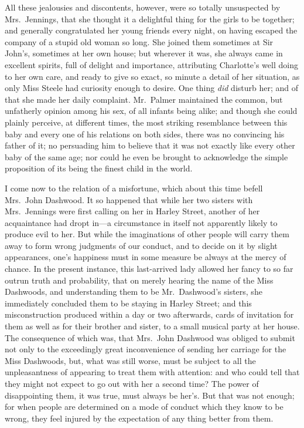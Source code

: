 All these jealousies and discontents, however, were so
totally unsuspected by Mrs.\ Jennings, that she thought
it a delightful thing for the girls to be together;
and generally congratulated her young friends every night,
on having escaped the company of a stupid old woman so long.
She joined them sometimes at Sir John's, sometimes
at her own house; but wherever it was, she always came
in excellent spirits, full of delight and importance,
attributing Charlotte's well doing to her own care, and ready
to give so exact, so minute a detail of her situation,
as only Miss Steele had curiosity enough to desire.
One thing \emph{did} disturb her; and of that she made her
daily complaint.  Mr.\ Palmer maintained the common,
but unfatherly opinion among his sex, of all infants being alike;
and though she could plainly perceive, at different times,
the most striking resemblance between this baby and every
one of his relations on both sides, there was no convincing
his father of it; no persuading him to believe that it
was not exactly like every other baby of the same age;
nor could he even be brought to acknowledge the simple
proposition of its being the finest child in the world.

I come now to the relation of a misfortune,
which about this time befell Mrs.\ John Dashwood.
It so happened that while her two sisters with
Mrs.\ Jennings were first calling on her in Harley Street,
another of her acquaintance had dropt in---a circumstance
in itself not apparently likely to produce evil to her.
But while the imaginations of other people will carry
them away to form wrong judgments of our conduct,
and to decide on it by slight appearances, one's happiness
must in some measure be always at the mercy of chance.
In the present instance, this last-arrived lady allowed
her fancy to so far outrun truth and probability,
that on merely hearing the name of the Miss Dashwoods,
and understanding them to be Mr.\ Dashwood's sisters,
she immediately concluded them to be staying in Harley Street;
and this misconstruction produced within a day
or two afterwards, cards of invitation for them
as well as for their brother and sister, to a small
musical party at her house.  The consequence of which was,
that Mrs.\ John Dashwood was obliged to submit not only
to the exceedingly great inconvenience of sending her
carriage for the Miss Dashwoods, but, what was still worse,
must be subject to all the unpleasantness of appearing
to treat them with attention: and who could tell that they
might not expect to go out with her a second time?  The power
of disappointing them, it was true, must always be her's.
But that was not enough; for when people are determined
on a mode of conduct which they know to be wrong, they feel
injured by the expectation of any thing better from them.


